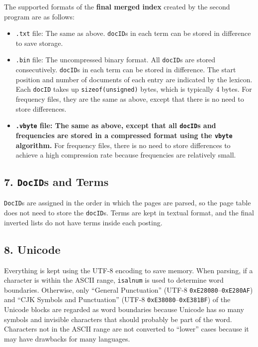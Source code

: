 \documentclass[12pt]{article}
\begin{document}
The supported formats of the \textbf{final merged index} created by the
second program are as follows:

\begin{itemize}
\item
  \texttt{.txt} file: The same as above. \texttt{docID}s in each term
  can be stored in difference to save storage.
\item
  \texttt{.bin} file: The uncompressed binary format. All
  \texttt{docID}s are stored consecutively. \texttt{docID}s in each term
  can be stored in difference. The start position and number of
  documents of each entry are indicated by the lexicon. Each
  \texttt{docID} takes up \texttt{sizeof(unsigned)} bytes, which is
  typically 4 bytes. For frequency files, they are the same as above,
  except that there is no need to store differences.
\item
  \textbf{\texttt{.vbyte} file: The same as above, except that all
  \texttt{docID}s and frequencies are stored in a compressed format
  using the \texttt{vbyte} algorithm.} For frequency files, there is no
  need to store differences to achieve a high compression rate because
  frequencies are relatively small.
\end{itemize}

\hypertarget{7-docids-and-terms}{%
\subsection{\texorpdfstring{7. \texttt{DocID}s and
Terms}{7. DocIDs and Terms}}\label{7-docids-and-terms}}

\texttt{DocID}s are assigned in the order in which the pages are parsed,
so the page table does not need to store the \texttt{docID}s. Terms are
kept in textual format, and the final inverted lists do not have terms
inside each posting.

\hypertarget{8-unicode}{%
\subsection{8. Unicode}\label{8-unicode}}

Everything is kept using the UTF-8 encoding to save memory. When
parsing, if a character is within the ASCII range, \texttt{isalnum} is
used to determine word boundaries. Otherwise, only ``General
Punctuation'' (UTF-8 \texttt{0xE28080}--\texttt{0xE280AF}) and ``CJK
Symbols and Punctuation'' (UTF-8 \texttt{0xE38080}--\texttt{0xE381BF}) of
the Unicode blocks are regarded as word boundaries because Unicode has
so many symbols and invisible characters that should probably be part of
the word. Characters not in the ASCII range are not converted to
``lower'' cases because it may have drawbacks for many languages.
\end{document}
